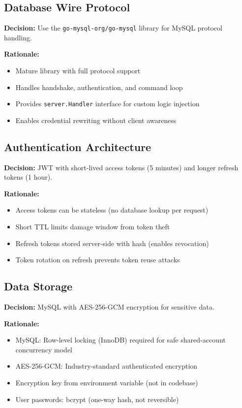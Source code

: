 \subsection{Database Wire Protocol}

\textbf{Decision:} Use the \texttt{go-mysql-org/go-mysql} library for MySQL protocol handling.

\textbf{Rationale:}
\begin{itemize}
    \item Mature library with full protocol support
    \item Handles handshake, authentication, and command loop
    \item Provides \texttt{server.Handler} interface for custom logic injection
    \item Enables credential rewriting without client awareness
\end{itemize}

\subsection{Authentication Architecture}

\textbf{Decision:} JWT with short-lived access tokens (5 minutes) and longer refresh tokens (1 hour).

\textbf{Rationale:}
\begin{itemize}
    \item Access tokens can be stateless (no database lookup per request)
    \item Short TTL limits damage window from token theft
    \item Refresh tokens stored server-side with hash (enables revocation)
    \item Token rotation on refresh prevents token reuse attacks
\end{itemize}

\subsection{Data Storage}

\textbf{Decision:} MySQL with AES-256-GCM encryption for sensitive data.

\textbf{Rationale:}
\begin{itemize}
    \item MySQL: Row-level locking (InnoDB) required for safe shared-account concurrency model
    \item AES-256-GCM: Industry-standard authenticated encryption
    \item Encryption key from environment variable (not in codebase)
    \item User passwords: bcrypt (one-way hash, not reversible)
\end{itemize}

